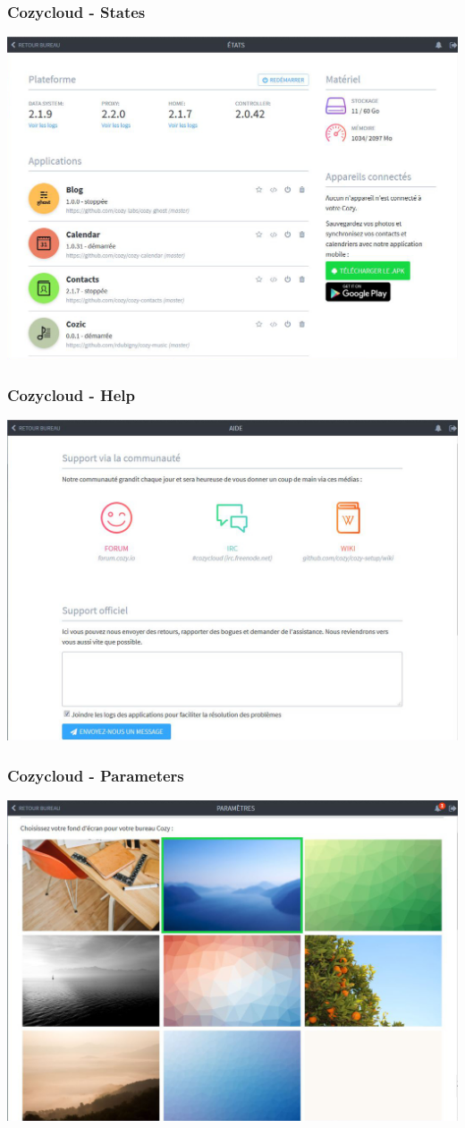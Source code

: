 \documentclass{beamer}
\begin{document}
\begin{frame}
\frametitle{Cozycloud - States}
\includegraphics[scale=0.3] {./CozyCloud/CozyCloud_Etats.jpg}
\end{frame}

\begin{frame}
\frametitle{Cozycloud - Help}
\includegraphics[scale=0.3] {./CozyCloud/CozyCloud_Aide.jpg}
\end{frame}

\begin{frame}
\frametitle{Cozycloud - Parameters}
\includegraphics[scale=0.3] {./CozyCloud/CozyCloud_Parametres.jpg}
\end{frame}
\end{document}
